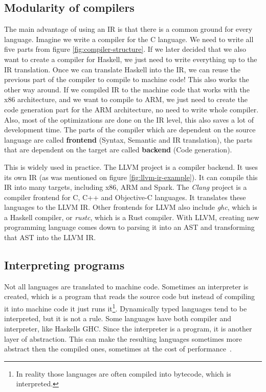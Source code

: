 \subsection{Modularity of compilers}
The main advantage of using an IR is that there is a common ground for every
language. Imagine we write a compiler for the C language. We need to write all
five parts from figure \ref{fig:compiler-structure}. If we later decided that
we also want to create a compiler for Haskell, we just need to write everything
up to the IR translation. Once we can translate Haskell into the IR, we can
reuse the previous part of the compiler to compile to machine code! This also
works the other way around. If we compiled IR to the machine code that works
with the x86 architecture, and we want to compile to ARM, we just need to
create the code generation part for the ARM architecture, no need to write
whole compiler. Also, most of the optimizations are done on the IR level, this
also saves a lot of development time. The parts of the compiler which are
dependent on the source language are called \textbf{frontend} (Syntax, Semantic
and IR translation), the parts that are dependent on the target are called
\textbf{backend} (Code generation).

This is widely used in practice. The LLVM \cite{llvm} project is a compiler
backend. It uses its own IR (as was mentioned on figure
\ref{fig:llvm-ir-example}). It can compile this IR into many targets, including
x86, ARM and Spark. The \textit{Clang} project is a compiler frontend for C,
C++ and Objective-C languages. It translates these languages to the LLVM IR.
Other frontends for LLVM also include \textit{ghc}, which is a Haskell
compiler, or \textit{rustc}, which is a Rust compiler. With LLVM, creating new
programming language comes down to parsing it into an AST and transforming that
AST into the LLVM IR.

\subsection{Interpreting programs}
Not all languages are translated to machine code. Sometimes an interpreter is
created, which is a program that reads the source code but instead of compiling
it into machine code it just runs it\footnote{In reality those languages are
often compiled into bytecode, which is interpreted.}. Dynamically typed
languages tend to be interpreted, but it is not a rule. Some languages have
both compiler and interpreter, like Haskells GHC. Since the interpreter is a
program, it is another layer of abstraction. This can make the resulting
languages sometimes more abstract then the compiled ones, sometimes at the cost
of performance~\cite{jit}. 

